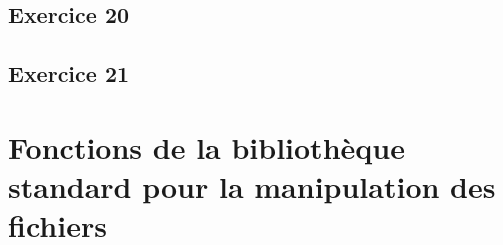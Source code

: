 \documentclass[12pt,a4paper,openany]{book}
\begin{document}
		\section{Exercice 20}
		
		\section{Exercice 21}
		
		\chapter{Fonctions de la bibliothèque standard pour la manipulation des fichiers}
		
		
		
\end{document}
